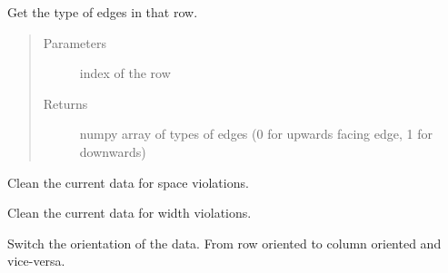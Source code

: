 \documentclass[a4paper,10pt,english]{sphinxmanual}
\begin{document}
\begin{fulllineitems}
\begin{fulllineitems}
\label{\detokenize{drc:kppc.drc.kppc.drc.slcleaner.PyDrcSl.get_row_types}}
Get the type of edges in that row.
\begin{quote}\begin{description}
\item[{Parameters}] \leavevmode
{} \textendash{} index of the row

\item[{Returns}] \leavevmode
numpy array of types of edges (0 for upwards facing edge, 1 for downwards)

\end{description}\end{quote}

\end{fulllineitems}


\begin{fulllineitems}
\label{\detokenize{drc:kppc.drc.kppc.drc.slcleaner.PyDrcSl.clean_space}}
Clean the current data for space violations.

\end{fulllineitems}


\begin{fulllineitems}
\label{\detokenize{drc:kppc.drc.kppc.drc.slcleaner.PyDrcSl.clean_width}}
Clean the current data for width violations.

\end{fulllineitems}


\begin{fulllineitems}
\label{\detokenize{drc:kppc.drc.kppc.drc.slcleaner.PyDrcSl.switch_dimensions}}
Switch the orientation of the data. From row oriented to column oriented and vice-versa.

\end{fulllineitems}


\end{fulllineitems}
\end{document}
